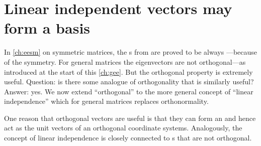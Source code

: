 
\section{Linear independent vectors may form a basis}
\label{sec:lisb}

\secttoc
\begin{comment}
\pooliv{p.92--7,198--208} \holti{\S2.3}
\end{comment}



In \autoref{ch:eesm} on symmetric matrices, the s from  are proved to be always ---because of the symmetry.  
For general matrices the eigenvectors are not orthogonal---as introduced at the start of this \autoref{ch:gee}.  
But the orthogonal property is extremely useful.
Question: is there some analogue of orthogonality that is similarly useful?
Answer: yes. 
We now extend ``orthogonal'' to the more general concept of ``linear independence'' which for general matrices replaces orthonormality.

One reason that orthogonal vectors are useful is that they can form an  and hence act as the unit vectors of an orthogonal coordinate systems.
Analogously, the concept of linear independence is closely connected to s that are not orthogonal.




